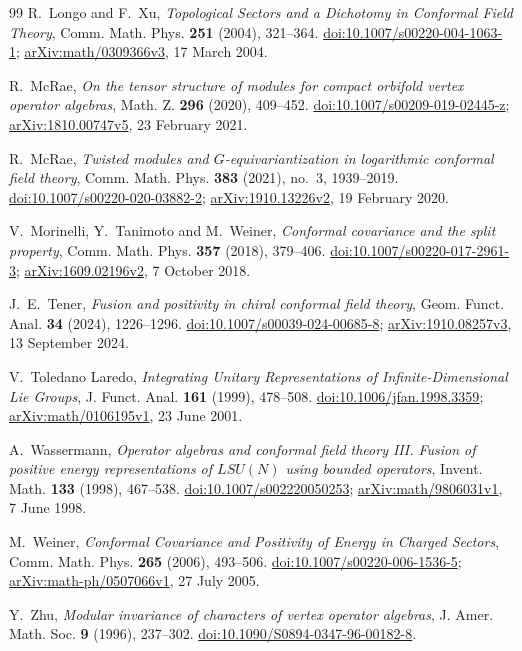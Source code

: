 \begin{thebibliography}{99}
R.~Longo and F.~Xu,
\emph{Topological Sectors and a Dichotomy in Conformal Field Theory},
Comm. Math. Phys. \textbf{251} (2004), 321--364.
\href{https://doi.org/10.1007/s00220-004-1063-1}{doi:10.1007/s00220-004-1063-1};
\href{https://arxiv.org/abs/math/0309366v3}{arXiv:math/0309366v3},
17 March 2004.

R.~McRae,
\emph{On the tensor structure of modules for compact orbifold vertex operator algebras},
Math. Z. \textbf{296} (2020), 409--452.
\href{https://doi.org/10.1007/s00209-019-02445-z}{doi:10.1007/s00209-019-02445-z};
\href{https://arxiv.org/abs/1810.00747v5}{arXiv:1810.00747v5},
23 February 2021.

R.~McRae,
\emph{Twisted modules and \(G\)-equivariantization in logarithmic conformal field theory},
Comm. Math. Phys. \textbf{383} (2021), no.~3, 1939--2019.
\href{https://doi.org/10.1007/s00220-020-03882-2}{doi:10.1007/s00220-020-03882-2};
\href{https://arxiv.org/abs/1910.13226v2}{arXiv:1910.13226v2},
19 February 2020.

V.~Morinelli, Y.~Tanimoto and M.~Weiner,
\emph{Conformal covariance and the split property},
Comm. Math. Phys. \textbf{357} (2018), 379--406.
\href{https://doi.org/10.1007/s00220-017-2961-3}{doi:10.1007/s00220-017-2961-3};
\href{https://arxiv.org/abs/1609.02196v2}{arXiv:1609.02196v2},
7 October 2018.

J.~E.~Tener,
\emph{Fusion and positivity in chiral conformal field theory},
Geom. Funct. Anal. \textbf{34} (2024), 1226--1296.
\href{https://doi.org/10.1007/s00039-024-00685-8}{doi:10.1007/s00039-024-00685-8};
\href{https://arxiv.org/abs/1910.08257v3}{arXiv:1910.08257v3},
13 September 2024.

V.~Toledano Laredo,
\emph{Integrating Unitary Representations of Infinite-Dimensional Lie Groups},
J. Funct. Anal. \textbf{161} (1999), 478--508.
\href{https://doi.org/10.1006/jfan.1998.3359}{doi:10.1006/jfan.1998.3359};
\href{https://arxiv.org/abs/math/0106195v1}{arXiv:math/0106195v1},
23 June 2001.

A.~Wassermann,
\emph{Operator algebras and conformal field theory III. Fusion of positive energy representations of \(LSU(N)\) using bounded operators},
Invent. Math. \textbf{133} (1998), 467--538.
\href{https://doi.org/10.1007/s002220050253}{doi:10.1007/s002220050253};
\href{https://arxiv.org/abs/math/9806031v1}{arXiv:math/9806031v1},
7 June 1998.

M.~Weiner,
\emph{Conformal Covariance and Positivity of Energy in Charged Sectors},
Comm. Math. Phys. \textbf{265} (2006), 493--506.
\href{https://doi.org/10.1007/s00220-006-1536-5}{doi:10.1007/s00220-006-1536-5};
\href{https://arxiv.org/abs/math-ph/0507066v1}{arXiv:math-ph/0507066v1},
27 July 2005.

Y.~Zhu,
\emph{Modular invariance of characters of vertex operator algebras},
J. Amer. Math. Soc. \textbf{9} (1996), 237--302.
\href{https://doi.org/10.1090/S0894-0347-96-00182-8}{doi:10.1090/S0894-0347-96-00182-8}.

\end{thebibliography}
